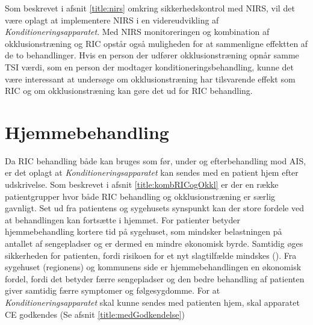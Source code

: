 Som beskrevet i afsnit \ref{title:nirs} omkring sikkerhedskontrol med NIRS, vil det være oplagt at implementere NIRS i en videreudvikling af \textit{Konditioneringsapparatet}. Med NIRS monitoreringen og kombination af okklusionstræning og RIC opstår også muligheden for at sammenligne effektten af de to behandlinger. Hvis en person der udfører okklusionstræning opnår samme TSI værdi, som en person der modtager konditioneringsbehandling, kunne det være interessant at undersøge om okklusionstræning har tilsvarende effekt som RIC og om okklusionstræning kan gøre det ud for RIC behandling. 

\section{Hjemmebehandling}\label{title:Hjemmebehandling}
Da RIC behandling både kan bruges som før, under og efterbehandling mod AIS, er det oplagt at \textit{Konditioneringsapparatet} kan sendes med en patient hjem efter udskrivelse. Som beskrevet i afsnit \ref{title:kombRICogOkkl} er der en række patientgrupper hvor både RIC behandling og okklusionstræning er særlig gavnligt. Set ud fra patientens og sygehusets synspunkt kan der store fordele ved at behandlingen kan fortsætte i hjemmet. For patienter betyder hjemmebehandling kortere tid på sygehuset, som mindsker belastningen på antallet af sengepladser og er dermed en mindre økonomisk byrde. Samtidig øges sikkerheden for patienten, fordi risikoen for et nyt slagtilfælde mindskes (\cite{RefWorks:20}). Fra sygehuset (regionens) og kommunens side er hjemmebehandlingen en økonomisk fordel, fordi det betyder færre sengepladser og den bedre behandling af patienten giver samtidig færre symptomer og følgesygdomme. 
For at \textit{Konditioneringsapparatet} skal kunne sendes med patienten hjem, skal apparatet CE godkendes (Se afsnit \ref{title:medGodkendelse})
